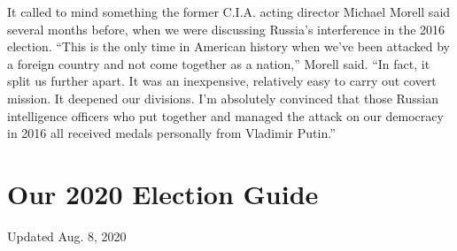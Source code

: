 It called to mind something the former C.I.A. acting director Michael
Morell said several months before, when we were discussing Russia's
interference in the 2016 election. ``This is the only time in American
history when we've been attacked by a foreign country and not come
together as a nation,'' Morell said. ``In fact, it split us further
apart. It was an inexpensive, relatively easy to carry out covert
mission. It deepened our divisions. I'm absolutely convinced that those
Russian intelligence officers who put together and managed the attack on
our democracy in 2016 all received medals personally from Vladimir
Putin.''

\hypertarget{our-2020-election-guide}{%
\section{Our 2020 Election Guide}\label{our-2020-election-guide}}

Updated Aug. 8, 2020


